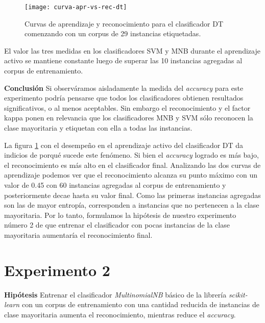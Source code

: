 \begin{figure}[h!]\label{curva-apr-vs-rec-dt}
\centering
\texttt{[image: curva-apr-vs-rec-dt]}
\caption{Curvas de aprendizaje y reconocimiento para el clasificador DT comenzando con un corpus de 29 instancias etiquetadas.}
\end{figure}

El valor las tres medidas en los clasificadores SVM y MNB durante el aprendizaje activo se mantiene constante luego de superar las 10 instancias agregadas al corpus de entrenamiento.

\vspace{3 mm}

\textbf{Conclusión}
Si observáramos aisladamente la medida del \textit{accuracy} para este experimento podría pensarse que todos los clasificadores obtienen resultados significativos, o al menos aceptables. Sin embargo el reconocimiento y el factor kappa ponen en relevancia que los clasificadores MNB y SVM sólo reconocen la clase mayoritaria y etiquetan con ella a todas las instancias.

La figura \ref{curva-apr-vs-rec-dt} con el desempeño en el aprendizaje activo del clasificador DT da indicios de porqué sucede este fenómeno. Si bien el \textit{accuracy} logrado es más bajo, el reconocimiento es más alto en el clasificador final. Analizando las dos curvas de aprendizaje podemos ver que el reconocimiento alcanza su punto máximo con un valor de 0.45 con 60 instancias agregadas al corpus de entrenamiento y posteriormente decae hasta su valor final. Como las primeras instancias agregadas son las de mayor entropía, corresponden a instancias que no pertenecen a la clase mayoritaria. Por lo tanto, formulamos la hipótesis de nuestro experimento número 2 de que entrenar el clasificador con pocas instancias de la clase mayoritaria aumentaría el reconocimiento final.

\section{Experimento 2}
\vspace{3 mm}
\textbf{Hipótesis} Entrenar el clasificador \textit{MultinomialNB} básico de la librería \textit{scikit-learn} con un corpus de entrenamiento con una cantidad reducida de instancias de clase mayoritaria aumenta el reconocimiento, mientras reduce el \textit{accuracy}.
\vspace{3 mm}

